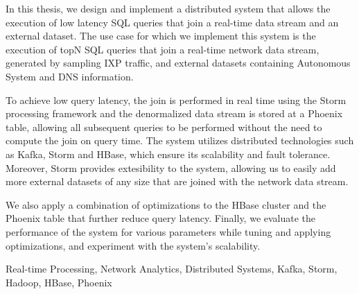 \begin{abstracten}

In this thesis, we design and implement a distributed system that allows the execution of low latency SQL queries that join a real-time data stream and an external dataset. The use case for which we implement this system is the execution of topN SQL queries that join a real-time network data stream, generated by sampling IXP traffic, and external datasets containing Autonomous System and DNS information. 

To achieve low query latency, the join is performed in real time using the Storm processing framework and the denormalized data stream is stored at a Phoenix table, allowing all subsequent queries to be performed without the need to compute the join on query time. The system utilizes distributed technologies such as Kafka, Storm and HBase, which ensure its scalability and fault tolerance. Moreover, Storm provides extesibility to the system, allowing us to easily add more external datasets of any size that are joined with the network data stream.

We also apply a combination of optimizations to the HBase cluster and the Phoenix table that further reduce query latency. Finally, we evaluate the performance of the system for various parameters while tuning and applying optimizations, and experiment with the system's scalability.

\begin{keywordsen}
Real-time Processing, Network Analytics, Distributed Systems, Kafka, Storm, Hadoop, HBase, Phoe\-nix
\end{keywordsen}
\end{abstracten}
